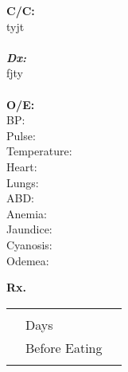 \documentclass[12pt]{article}
\begin{document}
\begin{paracol}{2}

    \begin{tcolorbox}[blanker, breakable, width=\linewidth]
    {\fontsize{8}{14}

    \textbf{\large C/C:}
    \\
    tyjt
    \\ \\
    \textbf{\large\em Dx:}
    \\
    fjty
    \\ \\
    \textbf{\large O/E:}
    \\
    BP:  \\
	Pulse: \\
	Temperature: \\
	Heart: \\
	Lungs: \\
	ABD: \\
	Anemia: \\
	Jaundice: \\
	Cyanosis: \\
	Odemea: \\
    }
    \end{tcolorbox}

    \setlength{\columnseprule}{0.4pt}
    \switchcolumn
    \begin{tcolorbox}[blanker, breakable, width=\linewidth]

    {\bf Rx.}
    \\
        \begin{supertabular}[l]{lll}
        \\
        
            {\bf }  &  &  \\
                 & Days &   \\
                 & Before Eating \\
                    &             &         \\
            
        \end{supertabular}
    \end{tcolorbox}
\end{paracol}
\end{document}
